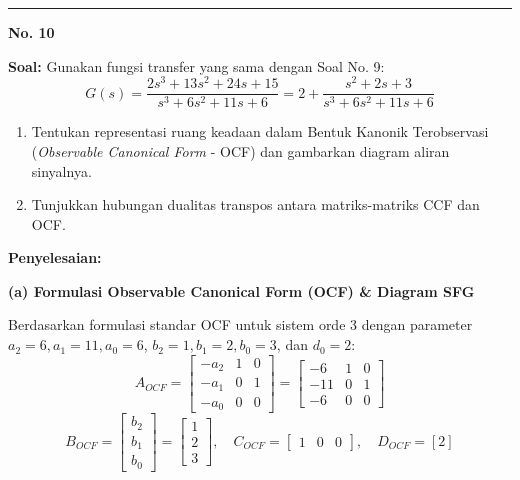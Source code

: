 \documentclass[11pt,a4paper]{article}
\begin{document}
\vspace{12pt}
\hrule
\vspace{10pt}

\textbf{\large No. 10}

\textbf{Soal:}  
Gunakan fungsi transfer yang sama dengan Soal No. 9:
$$G(s) = \frac{2s^3 + 13s^2 + 24s + 15}{s^3 + 6s^2 + 11s + 6} = 2 + \frac{s^2 + 2s + 3}{s^3 + 6s^2 + 11s + 6}$$
\begin{enumerate}[label=(\alph*)]
    \item Tentukan representasi ruang keadaan dalam Bentuk Kanonik Terobservasi (\textit{Observable Canonical Form} - OCF) dan gambarkan diagram aliran sinyalnya.
    \item Tunjukkan hubungan dualitas transpos antara matriks-matriks CCF dan OCF.
\end{enumerate}

\textbf{Penyelesaian:}

\textbf{(a) Formulasi Observable Canonical Form (OCF) \& Diagram SFG}

Berdasarkan formulasi standar OCF untuk sistem orde 3 dengan parameter $a_2=6, a_1=11, a_0=6$, $b_2=1, b_1=2, b_0=3$, dan $d_0=2$:
$$A_{OCF} = \begin{bmatrix} -a_2 & 1 & 0 \\ -a_1 & 0 & 1 \\ -a_0 & 0 & 0 \end{bmatrix} = \begin{bmatrix} -6 & 1 & 0 \\ -11 & 0 & 1 \\ -6 & 0 & 0 \end{bmatrix}$$
$$B_{OCF} = \begin{bmatrix} b_2 \\ b_1 \\ b_0 \end{bmatrix} = \begin{bmatrix} 1 \\ 2 \\ 3 \end{bmatrix}, \quad C_{OCF} = \begin{bmatrix} 1 & 0 & 0 \end{bmatrix}, \quad D_{OCF} = [2]$$
\end{document}
